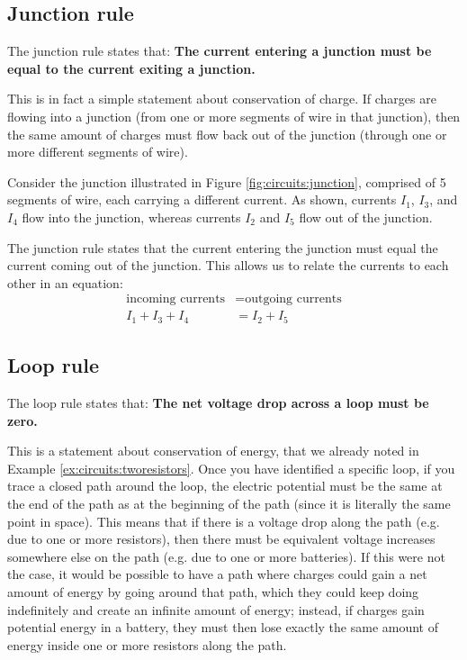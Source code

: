 \subsection{Junction rule}
The junction rule states that: \textbf{The current entering a junction must be equal to the current exiting a junction.}

This is in fact a simple statement about conservation of charge. If charges are flowing into a junction (from one or more segments of wire in that junction), then the same amount of charges must flow back out of the junction (through one or more different segments of wire).

Consider the junction illustrated in Figure \ref{fig:circuits:junction}, comprised of 5 segments of wire, each carrying a different current. As shown, currents $I_1$, $I_3$, and $I_4$ flow into the junction, whereas currents $I_2$ and $I_5$ flow out of the junction. 


The junction rule states that the current entering the junction must equal the current coming out of the junction. This allows us to relate the currents to each other in an equation:
\begin{align*}
\text{incoming currents}&=\text{outgoing currents}\\
I_1+I_3+I_4 &=I_2+I_5
\end{align*}

\subsection{Loop rule}
The loop rule states that: \textbf{The net voltage drop across a loop must be zero.}

This is a statement about conservation of energy, that we already noted in Example \ref{ex:circuits:tworesistors}. Once you have identified a specific loop, if you trace a closed path around the loop, the electric potential must be the same at the end of the path as at the beginning of the path (since it is literally the same point in space). This means that if there is a voltage drop along the path (e.g. due to one or more resistors), then there must be equivalent voltage increases somewhere else on the path (e.g. due to one or more batteries). If this were not the case, it would be possible to have a path where charges could gain a net amount of energy by going around that path, which they could keep doing indefinitely and create an infinite amount of energy; instead, if charges gain potential energy in a battery, they must then lose exactly the same amount of energy inside one or more resistors along the path.

